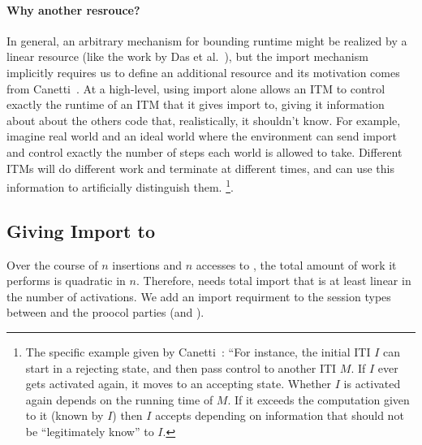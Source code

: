 \paragraph{Why another resrouce?} 
In general, an arbitrary mechanism for bounding runtime might be realized by a linear resource (like the work by Das et al.~\cite{rast}), but the import mechanism implicitly requires us to define an additional resource and its motivation comes from Canetti~\cite{uc}.
At a high-level, using import alone allows an ITM to control exactly the runtime of an ITM that it gives import to, giving it information about about the others code that, realistically, it shouldn't know.
For example, imagine real world and an ideal world where the environment can send import and control exactly the number of steps each world is allowed to take.
Different ITMs will do different work and terminate at different times, and \Z can use this information to artificially distinguish them.
\footnote{The specific example given by Canetti~\cite{UC}: ``For instance, the initial ITI $I$ can start in a rejecting state, and then pass control to another ITI $M$. If $I$ ever gets activated again, it moves to an accepting state. Whether $I$ is activated again depends on the running time of $M$. If it exceeds the computation given to it (known by $I$) then $I$ accepts depending on information that should not be ``legitimately know'' to $I$.}.

\subsection{Giving Import to \Fdb}
Over the course of $n$ insertions and $n$ accesses to \Fdb, the total amount of work it performs is quadratic in $n$.
Therefore, \Fdb needs total import that is at least linear in the number of activations.
We add an import requirment to the session types between \Fdb and the proocol parties (and \A).

